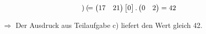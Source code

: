 \documentclass[twoside,colorbacktitle,accentcolor=tud2b]{tudexercise}
\begin{document}
\begin{enumerate}
\[\begin{pmatrix}
\end{pmatrix} \\
=
\begin{pmatrix}
17 & 21\\

\end{pmatrix}
\begin{bmatrix}
0
\end{bmatrix}
.
\begin{pmatrix}
0 & 2\\

\end{pmatrix} 
= 42
\]

$\Rightarrow$ 
Der Ausdruck aus Teilaufgabe c) liefert den Wert gleich 42.
\end{enumerate}
\end{document}
